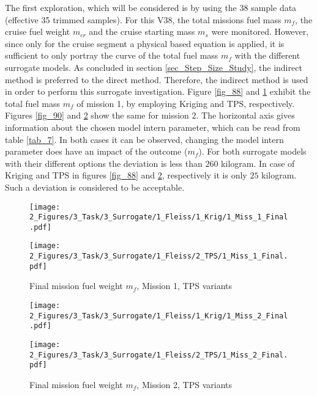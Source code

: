 The first exploration, which will be considered is 
by using the 38 sample data (effective 35 trimmed samples).
For this V38, the total missions fuel mass $m_f$, 
the cruise fuel weight $m_{cr}$ and the cruise 
starting mass $m_s$ were monitored. However, 
since only for the cruise segment 
a physical based equation is applied, it is sufficient 
to only portray the curve of the total 
fuel mass $m_f$ with the different 
surrogate models.
As concluded in section \ref{sec_Step_Size_Study}, the indirect 
method is preferred to the direct method. Therefore, 
the indirect method is used in order to perform this 
surrogate investigation.
Figure \ref{fig_88} and \ref{fig_89} exhibit the total 
fuel mass $m_f$ of mission 1, by 
employing Kriging and TPS, respectively. 
Figures \ref{fig_90} and \ref{fig_91} show
the same for mission 2.
The 
horizontal axis gives information about the chosen 
model intern parameter, which can be read from table \ref{tab_7}.
In both cases it can be observed, 
changing the model intern parameter does have an impact 
of the outcome ($m_{f}$). For both surrogate models
with their different options the deviation is less than 
$260$ kilogram. In case of Kriging and TPS in figures \ref{fig_88}
and \ref{fig_91}, respectively it is only $25$ kilogram. Such a deviation
is considered to be acceptable.

\begin{figure}[!h]
    \begin{minipage}[h]{0.46\textwidth}
        \centering
        \texttt{[image: 2\_Figures/3\_Task/3\_Surrogate/1\_Fleiss/1\_Krig/1\_Miss\_1\_Final.pdf]}
        \caption{Final mission fuel weight $m_f$, Mission 1, Kriging variants}
        \label{fig_88}    
    \end{minipage}
    \hfill
    \begin{minipage}{0.46\textwidth}
        \centering
        \texttt{[image: 2\_Figures/3\_Task/3\_Surrogate/1\_Fleiss/2\_TPS/1\_Miss\_1\_Final.pdf]}
        \caption{Final mission fuel weight $m_f$, Mission 1, TPS variants}
        \label{fig_89}    
    \end{minipage}
\end{figure} 


\begin{figure}[!h]
    \begin{minipage}[h]{0.46\textwidth}
        \centering
        \texttt{[image: 2\_Figures/3\_Task/3\_Surrogate/1\_Fleiss/1\_Krig/1\_Miss\_2\_Final.pdf]}
        \caption{Final mission fuel weight $m_f$, Mission 2, Kriging variants}
        \label{fig_90}    
    \end{minipage}
    \hfill
    \begin{minipage}{0.46\textwidth}
        \centering
        \texttt{[image: 2\_Figures/3\_Task/3\_Surrogate/1\_Fleiss/2\_TPS/1\_Miss\_2\_Final.pdf]}
        \caption{Final mission fuel weight $m_f$, Mission 2, TPS variants}
        \label{fig_91}    
    \end{minipage}
\end{figure} 

